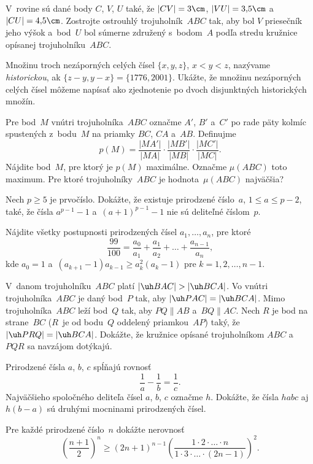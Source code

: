 {%
V~rovine sú dané body $C$, $V$, $U$ také, že $|CV|=3\cm$, $|VU|=3{,}5\cm$ a~$|CU|=4{,}5\cm$.
Zostrojte ostrouhlý trojuholník~$ABC$ tak, aby bol $V$ priesečník jeho výšok a~bod~$U$ bol
súmerne združený s~bodom~$A$ podľa stredu kružnice opísanej trojuholníku~$ABC$.}

{%
Množinu troch nezáporných celých čísel $\{x,y,z\}$, $x<y<z$, nazývame {\it historickou\/},
ak $\{z-y,y-x\}=\{1776,2001\}$. Ukážte, že množinu nezáporných celých čísel môžeme napísať
ako zjednotenie po dvoch disjunktných historických množín.}

{%
Pre bod~$M$ vnútri trojuholníka~$ABC$ označme $A'$, $B'$ a~$C'$ po rade päty kolmíc spustených
z~bodu~$M$ na priamky $BC$, $CA$ a~$AB$. Definujme
$$
p(M)=\frac{|MA'|}{|MA|} \cdot \frac{|MB'|}{|MB|} \cdot \frac{|MC'|}{|MC|}.
$$
Nájdite bod~$M$, pre ktorý je $p(M)$ maximálne. Označme $\mu(ABC)$ toto maximum.
Pre ktoré trojuholníky~$ABC$ je hodnota~$\mu(ABC)$ najväčšia?}

{%
Nech $p\ge5$ je prvočíslo. Dokážte, že existuje prirodzené číslo~$a$, $1\le a\le p-2$,
také, že čísla $a^{p-1}-1$ a~$(a+1)^{p-1}-1$ nie sú deliteľné číslom~$p$.}

{%
Nájdite všetky postupnosti prirodzených čísel $a_1,\dots,a_n$, pre ktoré
$$
\frac{99}{100}=\frac{a_0}{a_1}+\frac{a_1}{a_2}+\dots+\frac{a_{n-1}}{a_n},
$$
kde $a_0=1$ a~$(a_{k+1}-1)a_{k-1}\ge a_k^2(a_k-1)$ pre $k=1,2,\dots,n-1$.}

{%
V~danom trojuholníku~$ABC$ platí $|\uh BAC|>|\uh BCA|$. Vo vnútri trojuholníka~$ABC$ je daný
bod~$P$ tak, aby $|\uh PAC|=|\uh BCA|$. Mimo trojuholníka~$ABC$ leží bod~$Q$ tak, aby
$PQ\parallel AB$ a~$BQ\parallel AC$. Nech $R$ je bod na strane~$BC$ ($R$~je od bodu~$Q$
oddelený priamkou~$AP$) taký, že $|\uh PRQ|=|\uh BCA|$. Dokážte, že kružnice opísané
trojuholníkom $ABC$ a~$PQR$ sa navzájom dotýkajú.}

{%
Prirodzené čísla $a$, $b$, $c$ spĺňajú rovnosť
$$
\frac1a - \frac1b = \frac1c.
$$
Najväčšieho spoločného deliteľa čísel $a$, $b$, $c$ označme $h$. Dokážte, že čísla $habc$ aj
$h(b-a)$ sú druhými mocninami prirodzených čísel.}

{%
Pre každé prirodzené číslo~$n$ dokážte nerovnosť
$$
\left( \frac{n+1}2 \right)^n \ge
(2n+1)^{n-1}\left( \frac{1\cdot2\cdot\dots\cdot n}{1\cdot3\cdot\dots\cdot(2n-1)} \right)^2.
$$}

